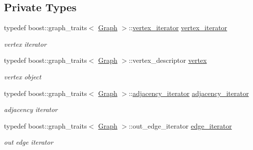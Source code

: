 \subsection*{Private Types}
\begin{DoxyCompactItemize}
\item 
typedef boost\+::graph\+\_\+traits$<$ \hyperlink{structGraph}{Graph} $>$\+::\hyperlink{classTTT__maximal__weighted__clique__fast_a3b094f452be803e5e28538732dbad9e0}{vertex\+\_\+iterator} \hyperlink{classTTT__maximal__weighted__clique__fast_a3b094f452be803e5e28538732dbad9e0}{vertex\+\_\+iterator}
\begin{DoxyCompactList}\small\item\em vertex iterator \end{DoxyCompactList}\item 
typedef boost\+::graph\+\_\+traits$<$ \hyperlink{structGraph}{Graph} $>$\+::vertex\+\_\+descriptor \hyperlink{classTTT__maximal__weighted__clique__fast_a55ca1f8931415f7338827925b86c218d}{vertex}
\begin{DoxyCompactList}\small\item\em vertex object \end{DoxyCompactList}\item 
typedef boost\+::graph\+\_\+traits$<$ \hyperlink{structGraph}{Graph} $>$\+::\hyperlink{classTTT__maximal__weighted__clique__fast_a75d8b34fb191bd1fbb4863931ebe9b7a}{adjacency\+\_\+iterator} \hyperlink{classTTT__maximal__weighted__clique__fast_a75d8b34fb191bd1fbb4863931ebe9b7a}{adjacency\+\_\+iterator}
\begin{DoxyCompactList}\small\item\em adjacency iterator \end{DoxyCompactList}\item 
typedef boost\+::graph\+\_\+traits$<$ \hyperlink{structGraph}{Graph} $>$\+::out\+\_\+edge\+\_\+iterator \hyperlink{classTTT__maximal__weighted__clique__fast_aa93d46889f2c32b755cfe6fb8f05e1df}{edge\+\_\+iterator}
\begin{DoxyCompactList}\small\item\em out edge iterator \end{DoxyCompactList}\end{DoxyCompactItemize}

